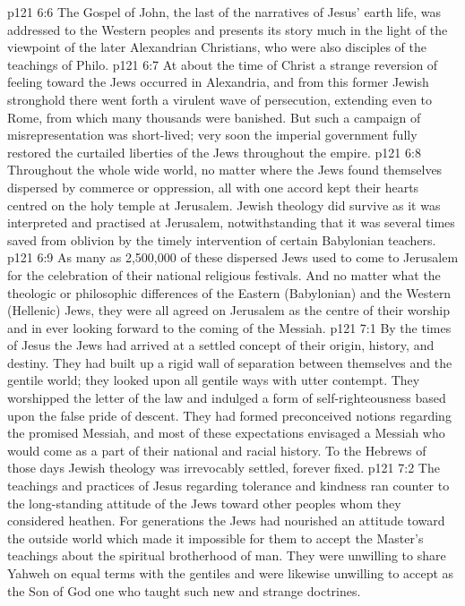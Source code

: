 \vs p121 6:6 The Gospel of John, the last of the narratives of Jesus’ earth life, was addressed to the Western peoples and presents its story much in the light of the viewpoint of the later Alexandrian Christians, who were also disciples of the teachings of Philo.
\vs p121 6:7 \pc At about the time of Christ a strange reversion of feeling toward the Jews occurred in Alexandria, and from this former Jewish stronghold there went forth a virulent wave of persecution, extending even to Rome, from which many thousands were banished. But such a campaign of misrepresentation was short\hyp{}lived; very soon the imperial government fully restored the curtailed liberties of the Jews throughout the empire.
\vs p121 6:8 Throughout the whole wide world, no matter where the Jews found themselves dispersed by commerce or oppression, all with one accord kept their hearts centred on the holy temple at Jerusalem. Jewish theology did survive as it was interpreted and practised at Jerusalem, notwithstanding that it was several times saved from oblivion by the timely intervention of certain Babylonian teachers.
\vs p121 6:9 As many as 2,500,000 of these dispersed Jews used to come to Jerusalem for the celebration of their national religious festivals. And no matter what the theologic or philosophic differences of the Eastern (Babylonian) and the Western (Hellenic) Jews, they were all agreed on Jerusalem as the centre of their worship and in ever looking forward to the coming of the Messiah.
\vs p121 7:1 By the times of Jesus the Jews had arrived at a settled concept of their origin, history, and destiny. They had built up a rigid wall of separation between themselves and the gentile world; they looked upon all gentile ways with utter contempt. They worshipped the letter of the law and indulged a form of self\hyp{}righteousness based upon the false pride of descent. They had formed preconceived notions regarding the promised Messiah, and most of these expectations envisaged a Messiah who would come as a part of their national and racial history. To the Hebrews of those days Jewish theology was irrevocably settled, forever fixed.
\vs p121 7:2 The teachings and practices of Jesus regarding tolerance and kindness ran counter to the long\hyp{}standing attitude of the Jews toward other peoples whom they considered heathen. For generations the Jews had nourished an attitude toward the outside world which made it impossible for them to accept the Master’s teachings about the spiritual brotherhood of man. They were unwilling to share Yahweh on equal terms with the gentiles and were likewise unwilling to accept as the Son of God one who taught such new and strange doctrines.
